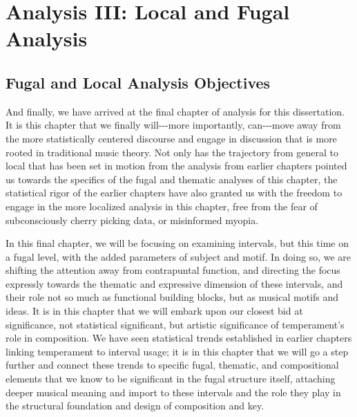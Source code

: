     
    
    

    \hypertarget{Analysis III: Local and Fugal Analysis}{\chapter{Analysis III: Local and Fugal Analysis}\label{Analysis III: Local and Fugal Analysis}}


    \section{Fugal and Local Analysis
Objectives}\label{fugal-and-local-analysis-objectives}

    And finally, we have arrived at the final chapter of analysis for this
dissertation. It is this chapter that we finally will-\/-\/-more
importantly, can-\/-\/-move away from the more statistically centered
discourse and engage in discussion that is more rooted in traditional
music theory. Not only has the trajectory from general to local that has
been set in motion from the analysis from earlier chapters pointed us
towards the specifics of the fugal and thematic analyses of this
chapter, the statistical rigor of the earlier chapters have also granted
us with the freedom to engage in the more localized analysis in this
chapter, free from the fear of subconsciously cherry picking data, or
misinformed myopia.

In this final chapter, we will be focusing on examining intervals, but
this time on a fugal level, with the added parameters of subject and
motif. In doing so, we are shifting the attention away from contrapuntal
function, and directing the focus expressly towards the thematic and
expressive dimension of these intervals, and their role not so much as
functional building blocks, but as musical motifs and ideas. It is in
this chapter that we will embark upon our closest bid at significance,
not statistical significant, but artistic significance of temperament's
role in composition. We have seen statistical trends established in
earlier chapters linking temperament to interval usage; it is in this
chapter that we will go a step further and connect these trends to
specific fugal, thematic, and compositional elements that we know to be
significant in the fugal structure itself, attaching deeper musical
meaning and import to these intervals and the role they play in the
structural foundation and design of composition and key.

